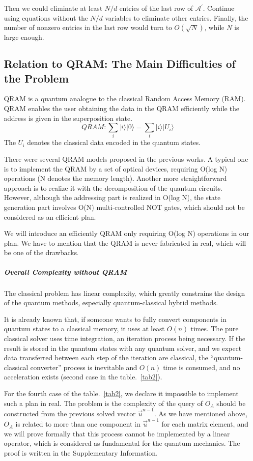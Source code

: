 \documentclass[%
 reprint,
 amsmath,amssymb,
pra,
]{revtex4-1}
\begin{document}
Then we could eliminate at least $N/d$ entries of the last row of $\mathcal{A^{\prime}}$. Continue using equations without the $N/d$ variables to eliminate other entries. Finally, the number of nonzero entries in the last row would turn to $O(\sqrt{N})$, while $N$ is large enough.
\fi


\subsection{Relation to QRAM: The Main Difficulties of the Problem}

QRAM is a quantum analogue to the classical Random Access Memory (RAM). QRAM enables the user obtaining the data in the QRAM efficiently while the address is given in the superposition state. 
$$
QRAM: \sum_i{|i\rangle|0\rangle}=\sum_i{|i\rangle|U_i\rangle}
$$
The $U_i$ denotes the classical data encoded in the quantum states.

There were several QRAM models proposed in the previous works. A typical one is to implement the QRAM by a set of optical devices, requiring O(log N) operations (N denotes the memory length). Another more straightforward approach is to realize it with the decomposition of the quantum circuits. However, although the addressing part is realized in O(log N), the state generation part involves O(N) multi-controlled NOT gates, which should not be considered as an efficient plan.

We will introduce an efficiently QRAM only requiring O(log N) operations in our plan. We have to mention that the QRAM is never fabricated in real, which will be one of the drawbacks.

\subparagraph{Overall Complexity without QRAM} The classical problem has linear complexity, which greatly constrains the design of the quantum methods, especially quantum-classical hybrid methods. 

It is already known that, if someone wants to fully convert components in quantum states to a classical memory, it uses at least $O(n)$ times. The pure classical solver uses time integration, an iteration process being necessary. If the result is stored in the quantum states with any quantum solver, and we expect data transferred between each step of the iteration are classical, the “quantum-classical converter” process is inevitable and $O(n)$ time is consumed, and no acceleration exists (second case in the table.~\ref{tab2}).

For the fourth case of the table.~\ref{tab2}, we declare it impossible to implement such a plan in real. The problem is the complexity of the query of $O_A$ should be constructed from the previous solved vector $\vec{u}^{n-1}$. As we have mentioned above, $O_A$ is related to more than one component in $\vec{u}^{n-1}$ for each matrix element, and we will prove formally that this process cannot be implemented by a linear operator, which is considered as fundamental for the quantum mechanics. The proof is written in the Supplementary Information.
\end{document}
